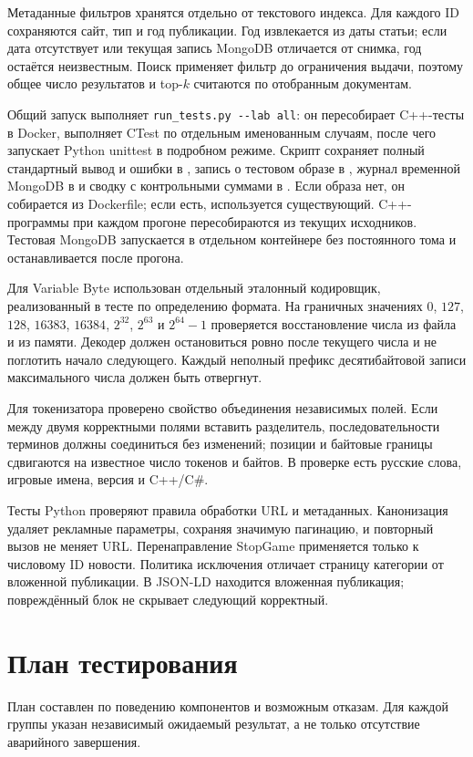 \documentclass[12pt,a4paper]{article}
\begin{document}
Метаданные фильтров хранятся отдельно от текстового индекса. Для каждого
ID сохраняются сайт, тип и год публикации. Год извлекается из даты статьи;
если дата отсутствует или текущая запись MongoDB отличается от снимка,
год остаётся неизвестным. Поиск применяет фильтр до ограничения выдачи,
поэтому общее число результатов и top-$k$ считаются по отобранным документам.

Общий запуск выполняет \verb|run_tests.py --lab all|: он пересобирает
C++-тесты в Docker, выполняет CTest по отдельным именованным случаям,
после чего запускает Python unittest в подробном режиме.
Скрипт  сохраняет полный стандартный вывод
и ошибки в , запись о тестовом образе в
, журнал временной MongoDB в 
и сводку с контрольными суммами в
. Если образа нет, он собирается из Dockerfile;
если есть, используется существующий. C++-программы при каждом прогоне
пересобираются из текущих исходников. Тестовая MongoDB запускается в
отдельном контейнере без постоянного тома и останавливается после прогона.

Для Variable Byte использован отдельный эталонный кодировщик, реализованный
в тесте по определению формата. На граничных значениях $0$, $127$, $128$,
$16383$, $16384$, $2^{32}$, $2^{63}$ и $2^{64}-1$ проверяется восстановление
числа из файла и из памяти. Декодер должен остановиться ровно после
текущего числа и не поглотить начало следующего. Каждый неполный префикс
десятибайтовой записи максимального числа должен быть отвергнут.

Для токенизатора проверено свойство объединения независимых полей.
Если между двумя корректными полями вставить разделитель, последовательности
терминов должны соединиться без изменений; позиции и байтовые границы
сдвигаются на известное число токенов и байтов. В проверке есть русские
слова, игровые имена, версия и C++/C\#.

Тесты Python проверяют правила обработки URL и метаданных. Канонизация
удаляет рекламные параметры, сохраняя значимую
пагинацию, и повторный вызов не меняет URL. Перенаправление StopGame
применяется только к числовому ID новости. Политика исключения отличает
страницу категории от вложенной публикации. В JSON-LD находится вложенная
публикация; повреждённый блок не скрывает следующий корректный.

\section{План тестирования}
План составлен по поведению компонентов и возможным отказам. Для каждой
группы указан независимый ожидаемый результат, а не только отсутствие
аварийного завершения.
\end{document}

